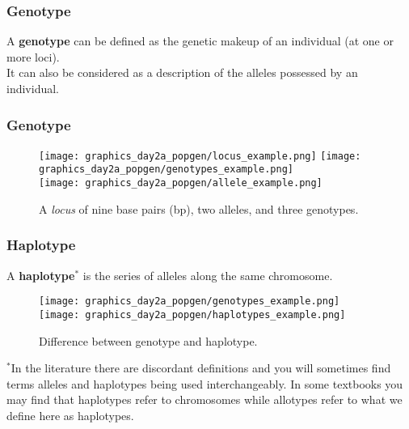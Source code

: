 \documentclass{beamer}
\newcommand{\1}{\ensuremath{\mathbf{1}}}
\begin{document}
%
%
%
\begin{frame}\frametitle{Genotype}
	A \textbf{genotype} can be defined as the genetic makeup of an individual (at one or more loci).\\[2ex]
	It can also be considered as a description of the alleles possessed by an individual.
\end{frame}
%
%
%
\begin{frame}\frametitle{Genotype}
	\begin{figure}
	\begin{center}
		\texttt{[image: graphics\_day2a\_popgen/locus\_example.png]}
		\texttt{[image: graphics\_day2a\_popgen/genotypes\_example.png]}\\[2ex]
		\texttt{[image: graphics\_day2a\_popgen/allele\_example.png]}\phantom{menace}\phantom{menace}
	\end{center}
	\caption{A \emph{locus} of nine base pairs (bp), two alleles, and three genotypes.}
	\end{figure}
\end{frame}
%
%
%
\begin{frame}\frametitle{Haplotype}
	A \textbf{haplotype}$^{*}$ is the series of alleles along the same chromosome.
	\begin{figure}
	\begin{center}
		\texttt{[image: graphics\_day2a\_popgen/genotypes\_example.png]}
		\texttt{[image: graphics\_day2a\_popgen/haplotypes\_example.png]}
	\end{center}
	\caption{Difference between genotype and haplotype.}
	\end{figure}
	{\tiny $^{*}$In the literature there are discordant definitions and you will sometimes find terms alleles and haplotypes being used interchangeably. In some textbooks you may find that haplotypes refer to chromosomes while allotypes refer to what we define here as haplotypes.}
\end{frame}
\end{document}
